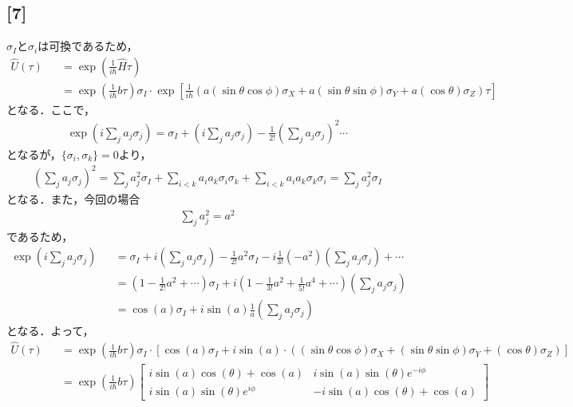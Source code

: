 \documentclass[12pt,dvipdfmx]{jsarticle}
\begin{document}
\subsection*{\large{[7]}}
$\sigma_I$と$\sigma_i$は可換であるため，
\begin{eqnarray}
  \hat{U}(\tau) &&= \exp\left( \frac{1}{i\hbar}\hat{H}\tau \right) \\
  &&= \exp\left( \frac{1}{i\hbar}b\tau \right)\sigma_I \cdot \exp\left[ \frac{1}{i\hbar} \left( a(\sin\theta\cos\phi)\sigma_X + a(\sin\theta\sin\phi)\sigma_Y + a(\cos\theta)\sigma_Z \right) \tau \right]
\end{eqnarray}
となる．ここで，
\begin{eqnarray}
  \exp\left( i\sum_j a_j \sigma_j \right) = \sigma_I + \left(i\sum_j a_j \sigma_j\right) - \frac{1}{2!}\left( \sum_j a_j \sigma_j \right)^2 \cdots
\end{eqnarray}
となるが，$\{ \sigma_i,\sigma_k \}=0$より，
\begin{eqnarray}
  \left( \sum_j a_j \sigma_j \right)^2 = \sum_j a_j^2\sigma_I + \sum_{i<k}a_i a_k\sigma_i\sigma_k + \sum_{i<k}a_i a_k\sigma_k\sigma_i = \sum_j a_j^2\sigma_I
\end{eqnarray}
となる．また，今回の場合
\begin{eqnarray}
  \sum_j a_j^2= a^2
\end{eqnarray}
であるため，
\begin{eqnarray}
  \exp\left( i\sum_j a_j \sigma_j \right) &&= \sigma_I +i \left(\sum_j a_j \sigma_j\right) - \frac{1}{2!}a^2 \sigma_I -i\frac{1}{3!}(-a^2) \left(\sum_j a_j \sigma_j\right)+\cdots\\
  &&= \left( 1 - \frac{1}{2!}a^2 + \cdots \right)\sigma_I + i \left( 1-\frac{1}{3!}a^2 + \frac{1}{5!}a^4+\cdots \right)\left(\sum_j a_j \sigma_j\right) \\
  &&= \cos\left( a \right) \sigma_I + i \sin(a)\frac{1}{a}\left(\sum_j a_j \sigma_j\right)
\end{eqnarray}
となる．よって，
\begin{eqnarray}
  \hat{U}(\tau) &&= \exp\left( \frac{1}{i\hbar}b\tau \right)\sigma_I\cdot \left[ \cos\left( a \right) \sigma_I + i \sin(a)\cdot \left( (\sin\theta\cos\phi)\sigma_X + (\sin\theta\sin\phi)\sigma_Y + (\cos\theta)\sigma_Z \right) \right]\\
  &&=\exp\left( \frac{1}{i\hbar}b\tau \right)
  \begin{bmatrix}
    i\sin(a)\cos(\theta) + \cos(a) & i\sin(a)\sin(\theta)e^{-i\phi}\\
    i\sin(a)\sin(\theta)e^{i\phi} & - i\sin(a)\cos(\theta) + \cos(a)
  \end{bmatrix}
\end{eqnarray}
\end{document}
